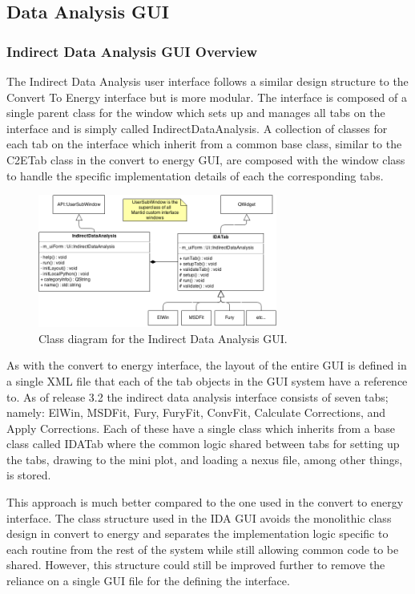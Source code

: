 \documentclass[paper=a4, fontsize=11pt]{scrartcl}	%
\numberwithin{equation}{section}															%
\numberwithin{figure}{section}																%
\numberwithin{table}{section}																%
\begin{document}
\subsection{Data Analysis GUI}

\subsubsection{Indirect Data Analysis GUI Overview}
\label{subsubsec:IDA-GUI-Overview}
The Indirect Data Analysis user interface follows a similar design structure to the Convert To Energy interface but is more modular. The interface is composed of a single parent class for the window which sets up and manages all tabs on the interface and is simply called IndirectDataAnalysis. A collection of classes for each tab on the interface which inherit from a common base class, similar to the C2ETab class in the convert to energy GUI, are composed with the window class to handle the specific implementation details of each the corresponding tabs.

\begin{figure}[H]
\centering
\includegraphics[width=0.7\textwidth]{img/uml/class_diagrams/IDA_structure.png}
\caption{Class diagram for the Indirect Data Analysis GUI.}
\label{fig:IDA-class-diagram}
\end{figure}

As with the convert to energy interface, the layout of the entire GUI is defined in a single XML file that each of the tab objects in the GUI system have a reference to. As of release 3.2 the indirect data analysis interface consists of seven tabs; namely: ElWin, MSDFit, Fury, FuryFit, ConvFit, Calculate Corrections, and Apply Corrections. Each of these have a single class which inherits from a base class called IDATab where the common logic shared between tabs for setting up the tabs, drawing to the mini plot, and loading a nexus file, among other things, is stored.

This approach is much better compared to the one used in the convert to energy interface. The class structure used in the IDA GUI avoids the monolithic class design in convert to energy and separates the implementation logic specific to each routine from the rest of the system while still allowing common code to be shared. However, this structure could still be improved further to remove the reliance on a single GUI file for the defining the interface.
\end{document}
